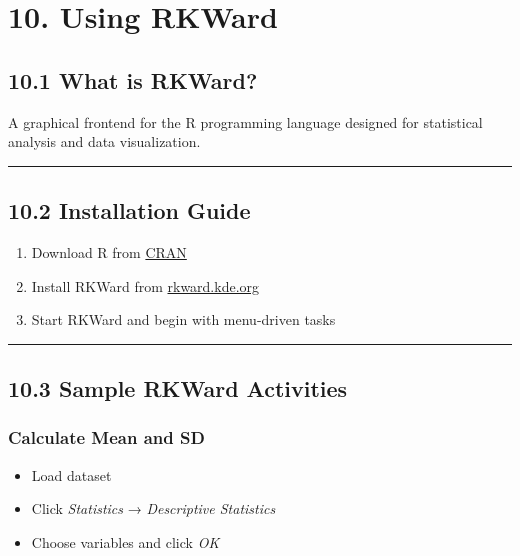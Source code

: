 \documentclass[
  letterpaper,
  DIV=11,
  numbers=noendperiod]{scrreprt}
\providecommand{\tightlist}{%
  \setlength{\itemsep}{0pt}\setlength{\parskip}{0pt}}
\begin{document}
\section{10. Using RKWard}\label{using-rkward}

\subsection{10.1 What is RKWard?}\label{what-is-rkward}

A graphical frontend for the R programming language designed for
statistical analysis and data visualization.

\begin{center}\rule{0.5\linewidth}{0.5pt}\end{center}

\subsection{10.2 Installation Guide}\label{installation-guide}

\begin{enumerate}
\def\labelenumi{\arabic{enumi}.}
\tightlist
\item
  Download R from \href{https://cran.r-project.org}{CRAN}
\item
  Install RKWard from \href{https://rkward.kde.org}{rkward.kde.org}
\item
  Start RKWard and begin with menu-driven tasks
\end{enumerate}

\begin{center}\rule{0.5\linewidth}{0.5pt}\end{center}

\subsection{10.3 Sample RKWard
Activities}\label{sample-rkward-activities}

\subsubsection{Calculate Mean and SD}\label{calculate-mean-and-sd}

\begin{itemize}
\tightlist
\item
  Load dataset
\item
  Click \emph{Statistics} → \emph{Descriptive Statistics}
\item
  Choose variables and click \emph{OK}
\end{itemize}
\end{document}
